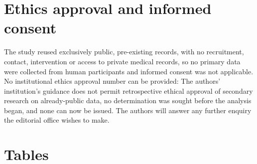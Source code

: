 \documentclass[11pt]{article}
\newcommand{\ethicsinstitution}{The authors' institution's}
\newcommand{\ethicscite}{}
\newcommand{\ethicsinstitution}{Trinity College Dublin}
\newcommand{\ethicscite}{~\cite{tcd2026_ethics_guidance}}
\begin{document}
\section*{Ethics approval and informed consent}
The study reused exclusively public, pre-existing records, with no recruitment, contact, intervention or access to private medical records, so no primary data were collected from human participants and informed consent was not applicable. No institutional ethics approval number can be provided: \ethicsinstitution{} guidance does not permit retrospective ethical approval of secondary research on already-public data\ethicscite, no determination was sought before the analysis began, and none can now be issued. The authors will answer any further enquiry the editorial office wishes to make.

\begingroup
\footnotesize

\endgroup

\clearpage
\section*{Tables}
\end{document}
